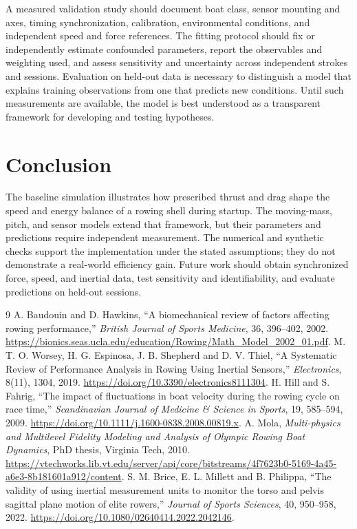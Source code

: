 \documentclass[11pt]{article}
\begin{document}
A measured validation study should document boat class, sensor mounting and axes, timing synchronization, calibration, environmental conditions, and independent speed and force references. The fitting protocol should fix or independently estimate confounded parameters, report the observables and weighting used, and assess sensitivity and uncertainty across independent strokes and sessions. Evaluation on held-out data is necessary to distinguish a model that explains training observations from one that predicts new conditions. Until such measurements are available, the model is best understood as a transparent framework for developing and testing hypotheses.

\section{Conclusion}
The baseline simulation illustrates how prescribed thrust and drag shape the speed and energy balance of a rowing shell during startup. The moving-mass, pitch, and sensor models extend that framework, but their parameters and predictions require independent measurement. The numerical and synthetic checks support the implementation under the stated assumptions; they do not demonstrate a real-world efficiency gain. Future work should obtain synchronized force, speed, and inertial data, test sensitivity and identifiability, and evaluate predictions on held-out sessions.

\begin{thebibliography}{9}
 A. Baudouin and D. Hawkins, ``A biomechanical review of factors affecting rowing performance,'' \emph{British Journal of Sports Medicine}, 36, 396--402, 2002. \url{https://bionics.seas.ucla.edu/education/Rowing/Math_Model_2002_01.pdf}.
 M. T. O. Worsey, H. G. Espinosa, J. B. Shepherd and D. V. Thiel, ``A Systematic Review of Performance Analysis in Rowing Using Inertial Sensors,'' \emph{Electronics}, 8(11), 1304, 2019. \url{https://doi.org/10.3390/electronics8111304}.
 H. Hill and S. Fahrig, ``The impact of fluctuations in boat velocity during the rowing cycle on race time,'' \emph{Scandinavian Journal of Medicine \& Science in Sports}, 19, 585--594, 2009. \url{https://doi.org/10.1111/j.1600-0838.2008.00819.x}.
 A. Mola, \emph{Multi-physics and Multilevel Fidelity Modeling and Analysis of Olympic Rowing Boat Dynamics}, PhD thesis, Virginia Tech, 2010. \url{https://vtechworks.lib.vt.edu/server/api/core/bitstreams/4f7623b0-5169-4a45-a6e3-8b181601a912/content}.
 S. M. Brice, E. L. Millett and B. Philippa, ``The validity of using inertial measurement units to monitor the torso and pelvis sagittal plane motion of elite rowers,'' \emph{Journal of Sports Sciences}, 40, 950--958, 2022. \url{https://doi.org/10.1080/02640414.2022.2042146}.
\end{thebibliography}
\end{document}
